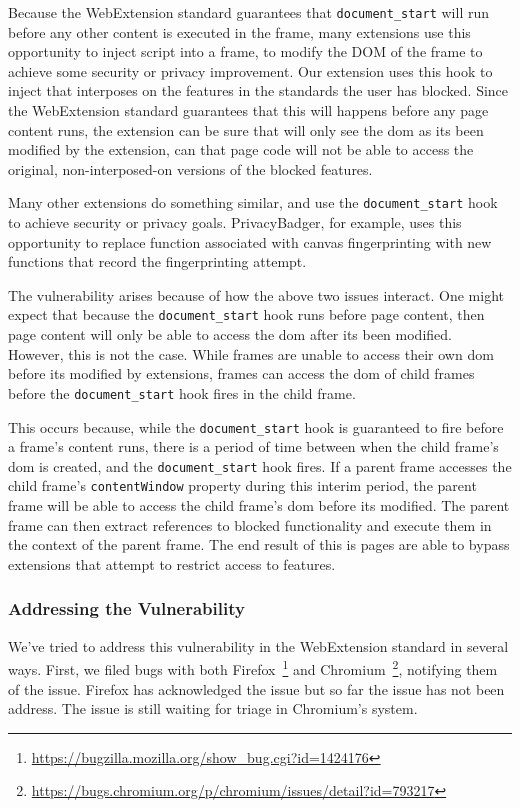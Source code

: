 Because the WebExtension standard guarantees that \texttt{document\_start} will
run before any other content is executed in the frame, many extensions use
this opportunity to inject script into a frame, to modify the DOM of the frame
to achieve some security or privacy improvement.  Our extension uses this
hook to inject \JS that interposes on the features in the standards the user
has blocked.  Since the WebExtension standard guarantees that this will happens
before any page content runs, the extension can be sure that will only see
the \gls{dom} as its been modified by the extension, can that page code
will not be able to access the original, non-interposed-on versions of the
blocked features.

Many other extensions do something similar, and use the
\texttt{document\_start} hook to achieve security or privacy goals.
PrivacyBadger, for example, uses this opportunity to replace \WAPI function
associated with canvas fingerprinting with new functions that record the
fingerprinting attempt.


The vulnerability arises because of how the above two issues interact.  One
might expect that because the \texttt{document\_start} hook runs before
page content, then page content will only be able to access the \gls{dom}
after its been modified.  However, this is not the case.  While frames are unable
to access their own \gls{dom} before its modified by extensions, frames can
access the \gls{dom} of child frames before the \texttt{document\_start}
hook fires in the child frame.

This occurs because, while the \texttt{document\_start} hook is guaranteed to
fire before a frame's content runs, there is a period of time between
when the child frame's \gls{dom} is created, and the \texttt{document\_start}
hook fires.  If a parent frame accesses the child frame's \texttt{contentWindow}
property during this interim period, the parent frame will be able to access
the child frame's \gls{dom} before its modified.  The parent frame
can then extract references to blocked functionality and execute them
in the context of the parent frame.  The end result of this is pages are able
to bypass extensions that attempt to restrict access to \WAPI features.


\subsubsection{Addressing the Vulnerability}
We've tried to address this vulnerability in the WebExtension standard in
several ways.  First, we filed bugs with both
Firefox~\footnote{\url{https://bugzilla.mozilla.org/show_bug.cgi?id=1424176}}
and Chromium~\footnote{\url{https://bugs.chromium.org/p/chromium/issues/detail?id=793217}},
notifying them of the issue.  Firefox has acknowledged the issue but so far the
issue has not been address.  The issue is still waiting for triage in
Chromium's system.

